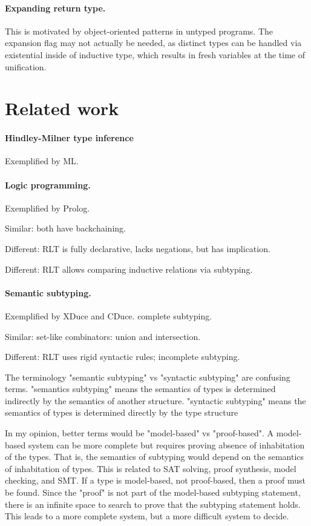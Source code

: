 \documentclass[acmsmall]{acmart}
\begin{document}
\paragraph{Expanding return type.}  
This is motivated by object-oriented patterns in untyped programs.
The expansion flag may not actually be needed, as distinct types can be handled via existential inside of inductive type,
which results in fresh variables at the time of unification.

\section{Related work}

\paragraph{Hindley-Milner type inference}
Exemplified by ML.

\paragraph{Logic programming.}
Exemplified by Prolog. 

Similar: both have backchaining. 

Different: RLT is fully declarative, lacks negations, but has implication. 

Different: RLT allows comparing inductive relations via subtyping. 

\paragraph{Semantic subtyping.} 
Exemplified by XDuce and CDuce. complete subtyping.

Similar: set-like combinators: union and intersection.

Different: RLT uses rigid syntactic rules; incomplete subtyping.

The terminology "semantic subtyping" vs "syntactic subtyping" are confusing terms. 
"semantics subtyping" means the semantics of types is determined indirectly by the semantics of another structure.
"syntactic subtyping" means the semantics of types is determined directly by the type structure

In my opinion, better terms would be "model-based" vs "proof-based".
A model-based system can be more complete but requires proving absence of inhabitation of the types.
That is, the semantics of subtyping would depend on the semantics of inhabitation of types.
This is related to SAT solving, proof synthesis, model checking, and SMT.
If a type is model-based, not proof-based, then a proof must be found.
Since the "proof" is not part of the model-based subtyping statement, 
there is an infinite space to search to prove that the subtyping statement holds.
This leads to a more complete system, but a more difficult system to decide.
\end{document}
